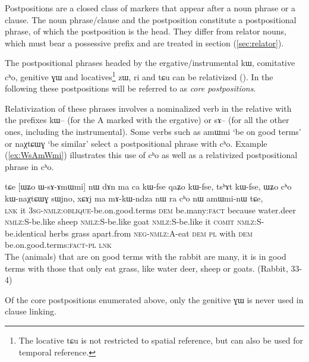 \documentclass[oldfontcommands,oneside,a4paper,11pt]{article}
\newcommand{\ipa}[1]{{\phon \mbox{#1}}} %
\newcommand{\refb}[1]{(\ref{#1})}
\begin{document}
Postpositions are a closed class of markers that appear after a noun phrase or a clause. The noun phrase/clause and the postposition constitute a postpositional phrase, of which the postposition is the head. They differ from relator nouns, which must bear a possessive prefix and are treated in section \refb{sec:relator}.  

The   postpositional phrases headed by the  ergative/instrumental \ipa{kɯ}, comitative \ipa{cʰo}, genitive \ipa{ɣɯ} and  locatives\footnote{The locative \ipa{tɕu} is not restricted to spatial reference, but can also be used for temporal reference. } \ipa{zɯ}, \ipa{ri} and \ipa{tɕu} can be relativized  (\citealt{jacques14relatives}). In the following these postpositions will be referred to as \textit{core postpositions}.

Relativization of these phrases involves a nominalized verb in the relative with the prefixes \ipa{kɯ--} (for the A marked with the ergative) or \ipa{sɤ--} (for all the other ones, including the instrumental). Some verbs  such as \ipa{amɯmi} `be on good terms' or \ipa{naχtɕɯɣ} `be similar' select a postpositional phrase with \ipa{cʰo}. Example \refb{ex:WsAmWmi} illustrates this use of \ipa{cʰo} as well as a relativized postpositional phrase in \ipa{cʰo}.

\begin{exe}
   \ex \label{ex:WsAmWmi}
 \gll 
\ipa{tɕe}   	[\ipa{ɯʑo}   	\ipa{ɯ-sɤ-ɤmɯmi}]   	\ipa{nɯ}   	\ipa{dɤn}   	\ipa{ma}   	\ipa{ca}   	\ipa{kɯ-fse}   	\ipa{qaʑo}   	\ipa{kɯ-fse,}   	\ipa{tsʰɤt}   	\ipa{kɯ-fse,}   	 \ipa{ɯʑo}   	\ipa{cʰo}   	\ipa{kɯ-naχtɕɯɣ}   	\ipa{sɯjno,}   	\ipa{xɕɤj}   	\ipa{ma}   	\ipa{mɤ-kɯ-ndza}   	\ipa{nɯ} \ipa{ra}   	\ipa{cʰo}   	\ipa{nɯ}   	\ipa{amɯmi-nɯ}   	\ipa{tɕe,}   \\
\textsc{lnk} it \textsc{3sg-nmlz:oblique}-be.on.good.terms \textsc{dem} be.many:\textsc{fact} because water.deer \textsc{nmlz:S}-be.like sheep \textsc{nmlz:S}-be.like goat  \textsc{nmlz:S}-be.like it \textsc{comit}  \textsc{nmlz:S}-be.identical herbs grass apart.from \textsc{neg-nmlz:A}-eat \textsc{dem} \textsc{pl} with \textsc{dem} be.on.good.terms:\textsc{fact}-\textsc{pl} \textsc{lnk} \\
\glt The (animals) that are on good terms with the rabbit are many, it is in good terms with those that only eat grass, like water deer, sheep or goats. (Rabbit, 33-4)
\end{exe}

Of the core postpositions enumerated above, only the genitive \ipa{ɣɯ} is never used in clause linking.
\end{document}
